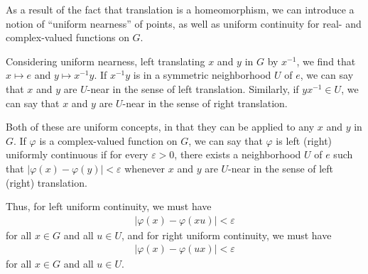 \documentclass[10pt]{extarticle}
\newcommand{\ve}{\varepsilon}
\theoremstyle{plain}
\theoremstyle{definition}
\theoremstyle{note}
\renewcommand{\newline}{\hfill\break}
\begin{document}
As a result of the fact that translation is a homeomorphism, we can introduce a notion of ``uniform nearness'' of points, as well as uniform continuity for real- and complex-valued functions on $G$.\newline

Considering uniform nearness, left translating $x$ and $y$ in $G$ by $x^{-1}$, we find that $x\mapsto e$ and $y\mapsto x^{-1} y$. If $x^{-1}y$ is in a symmetric neighborhood $U$ of $e$, we can say that $x$ and $y$ are $U$-near in the sense of left translation. Similarly, if $yx^{-1}\in U$, we can say that $x$ and $y$ are $U$-near in the sense of right translation.\newline

Both of these are uniform concepts, in that they can be applied to any $x$ and $y$ in $G$. If $\varphi$ is a complex-valued function on $G$, we can say that $\varphi$ is left (right) uniformly continuous if for every $\ve > 0$, there exists a neighborhood $U$ of $e$ such that $\left\vert \varphi(x)-\varphi(y) \right\vert < \ve$ whenever $x$ and $y$ are $U$-near in the sense of left (right) translation.\newline

Thus, for left uniform continuity, we must have
\begin{align*}
  \left\vert \varphi(x) - \varphi(xu) \right\vert < \ve
\end{align*}
for all $x\in G$ and all $u\in U$, and for right uniform continuity, we must have
\begin{align*}
  \left\vert \varphi(x) - \varphi(ux)  \right\vert < \ve
\end{align*}
for all $x\in G$ and all $u\in U$.\newline
\end{document}
